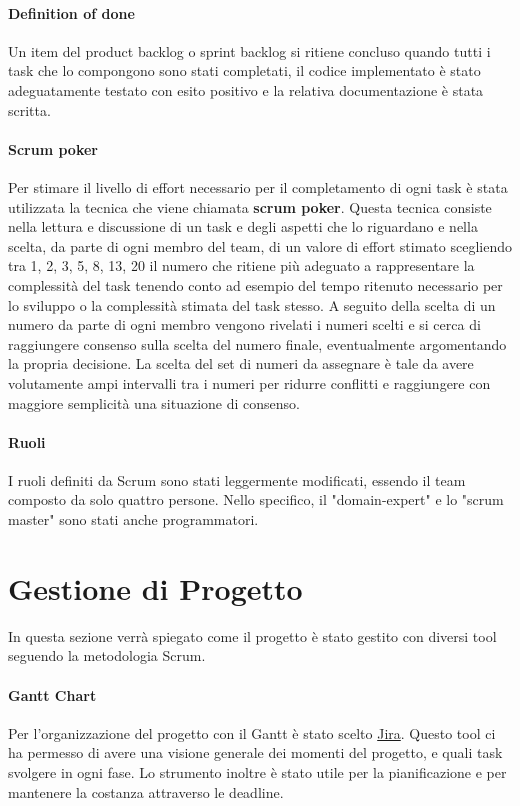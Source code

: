     \paragraph{Definition of done} Un item del product backlog o sprint backlog si ritiene concluso quando tutti i task che lo compongono sono stati completati, il codice implementato è stato adeguatamente testato con esito positivo e la relativa documentazione è stata scritta.
    
    \paragraph{Scrum poker} Per stimare il livello di effort necessario per il completamento di ogni task è stata utilizzata la tecnica che viene chiamata \textbf{scrum poker}. Questa tecnica consiste nella lettura e discussione di un task e degli aspetti che lo riguardano e nella scelta, da parte di ogni membro del team, di un valore di effort stimato scegliendo tra 1, 2, 3, 5, 8, 13, 20 il numero che ritiene più adeguato a rappresentare la complessità del task tenendo conto ad esempio del tempo ritenuto necessario per lo sviluppo o la complessità stimata del task stesso. A seguito della scelta di un numero da parte di ogni membro vengono rivelati i numeri scelti e si cerca di raggiungere consenso sulla scelta del numero finale, eventualmente argomentando la propria decisione. La scelta del set di numeri da assegnare è tale da avere volutamente ampi intervalli tra i numeri per ridurre conflitti e raggiungere con maggiore semplicità una situazione di consenso.

    \paragraph{Ruoli}
    I ruoli definiti da Scrum sono stati leggermente modificati, essendo il team composto da solo quattro persone. Nello specifico, il "domain-expert" e lo "scrum master" sono stati anche programmatori. 
    


\section{Gestione di Progetto}
In questa sezione verrà spiegato come il progetto è stato gestito con diversi tool seguendo la metodologia Scrum.
    \paragraph{Gantt Chart} 
    Per l'organizzazione del progetto con il Gantt è stato scelto \href{https://riccardo-omiccioli.atlassian.net/jira/software/projects/IQ/boards/1/roadmap}{Jira}. Questo tool ci ha permesso di avere una visione generale dei momenti del progetto, e quali task svolgere in ogni fase. Lo strumento inoltre è stato utile per la pianificazione e per mantenere la costanza attraverso le deadline. 
    
